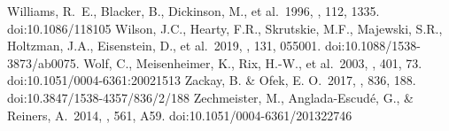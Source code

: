 \documentclass[modern]{aastex631}
\begin{document}
\begin{thebibliography}{dummy}
 Williams, R.~E., Blacker, B., Dickinson, M., et al.\ 1996, \aj, 112, 1335. doi:10.1086/118105
 Wilson, J.C., Hearty, F.R., Skrutskie, M.F., Majewski, S.R., Holtzman, J.A., Eisenstein, D., et al.\ 2019, \pasp, 131, 055001. doi:10.1088/1538-3873/ab0075.
 Wolf, C., Meisenheimer, K., Rix, H.-W., et al.\ 2003, \aap, 401, 73. doi:10.1051/0004-6361:20021513
 Zackay, B. \& Ofek, E. O.\ 2017, \apj, 836, 188. doi:10.3847/1538-4357/836/2/188
 Zechmeister, M., Anglada-Escud{\'e}, G., \& Reiners, A.\ 2014, \aap, 561, A59. doi:10.1051/0004-6361/201322746

\end{thebibliography}
\end{document}
